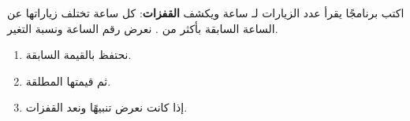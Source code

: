 \begin{statement}
اكتب برنامجًا يقرأ عدد الزيارات لـ  ساعة ويكشف \textbf{القفزات}: كل ساعة تختلف زياراتها عن الساعة السابقة بأكثر من . نعرض رقم الساعة ونسبة التغير.
\end{statement}
\begin{stepsbox}\begin{enumerate}
\item نحتفظ بالقيمة السابقة.
\item {} ثم قيمتها المطلقة.
\item إذا كانت  نعرض تنبيهًا ونعد القفزات.
\end{enumerate}\end{stepsbox}
